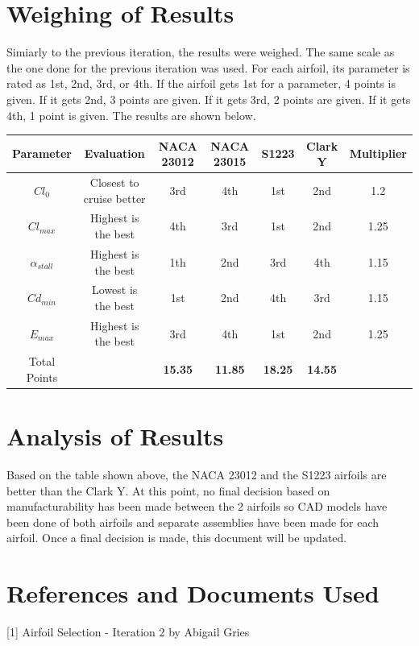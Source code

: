 \documentclass{article}
\begin{document}
\section{Weighing of Results}
Simiarly to the previous iteration, the results were weighed. The same scale as the one done for the previous iteration was used. For each airfoil, its parameter is rated as 1st, 2nd, 3rd, or 4th. If the airfoil gets 1st for a parameter, 4 points is given. If it gets 2nd, 3 points are given. If it gets 3rd, 2 points are given. If it gets 4th, 1 point is given. The results are shown below.\\
\begin{tabular}[pos]{| c | c | c | c | c | c | c |}
\hline
Parameter & Evaluation & NACA 23012 & NACA 23015 & S1223 & Clark Y & Multiplier \\ \hline
$Cl_{0}$ & Closest to cruise better & 3rd & 4th & 1st & 2nd & 1.2  \\ \hline
$Cl_{max}$ & Highest is the best & 4th & 3rd & 1st & 2nd & 1.25 \\ \hline
$\alpha_{stall}$ & Highest is the best & 1th & 2nd & 3rd & 4th & 1.15 \\ \hline
$Cd_{min}$ & Lowest is the best & 1st & 2nd & 4th & 3rd & 1.15 \\ \hline
$E_{max}$ & Highest is the best & 3rd & 4th & 1st & 2nd & 1.25  \\ \hline
Total Points & & \textbf{15.35} & \textbf{11.85} & \textbf{18.25} & \textbf{14.55} & \\ \hline
\end{tabular}

\section{Analysis of Results}
Based on the table shown above, the NACA 23012 and the S1223 airfoils are better than the Clark Y. At this point, no final decision based on manufacturability has been made between the 2 airfoils so CAD models have been done of both airfoils and separate assemblies have been made for each airfoil. Once a final decision is made, this document will be updated.

\section{References and Documents Used}
[1] Airfoil Selection - Iteration 2 by Abigail Gries
\end{document}
